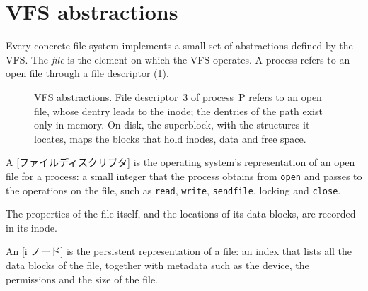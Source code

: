 \documentclass[../main.tex]{subfiles}
\begin{document}
\section{VFS abstractions}
\label{sec:l11-vfs-abs}

Every concrete file system implements a small set of abstractions defined
by the VFS.  The
\emph{file} is the element
on which the VFS operates.  A process refers to an open file through a file
descriptor (\cref{fig:l11-vfs-objects}).

\begin{figure}[tb]
  \centering
  
  \caption{VFS abstractions.  File descriptor~3 of process~P refers to an
    open file, whose dentry leads to the inode; the dentries of the path
    exist only in memory.  On disk, the superblock, with the structures it
    locates, maps the blocks that hold inodes, data and free space.}
  \label{fig:l11-vfs-objects}
\end{figure}

\begin{definition}
  A [ファイルディスクリプタ] is the operating system's
  representation of an open file for a process: a small integer that the
  process obtains from \texttt{open} and passes to the operations on the
  file, such as \texttt{read}, \texttt{write}, \texttt{sendfile},
  locking and \texttt{close}.
\end{definition}

The properties of the file itself, and the locations of its data blocks,
are recorded in its inode.

\begin{definition}[Inode]
  An [i ノード] is the persistent representation of a file: an
  index that lists all the data blocks of the file, together with metadata
  such as the device, the permissions and the size of the file.%
\end{definition}
\end{document}
